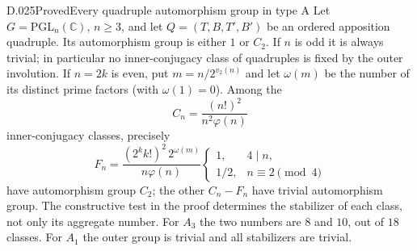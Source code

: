 \begin{saresult}{D.025}{Proved}{Every quadruple automorphism group in type A}
Let $G=\mathrm{PGL}_n(\mathbb C)$, $n\ge3$, and let
$Q=(T,B,T',B')$ be an ordered apposition quadruple.
Its automorphism group is either $1$ or $C_2$.
If $n$ is odd it is always trivial; in particular no inner-conjugacy
class of quadruples is fixed by the outer involution.
If $n=2k$ is even, put $m=n/2^{v_2(n)}$ and let
$\omega(m)$ be the number of its distinct prime factors
(with $\omega(1)=0$).  Among the
\[
 C_n=\frac{(n!)^2}{n^2\varphi(n)}
\]
inner-conjugacy classes, precisely
\[
 F_n=\frac{(2^k k!)^2\,2^{\omega(m)}}{n\varphi(n)}
       \begin{cases}1,&4\mid n,\\[2pt]1/2,&n\equiv2\pmod4\end{cases}
                                                               \tag{D25.1}
\]
have automorphism group $C_2$; the other $C_n-F_n$ have trivial
automorphism group.  The constructive test in the proof determines
the stabilizer of each class, not only its aggregate number.
For $A_3$ the two numbers are $8$ and $10$, out of $18$ classes.
For $A_1$ the outer group is trivial and all stabilizers are trivial.
\end{saresult}

